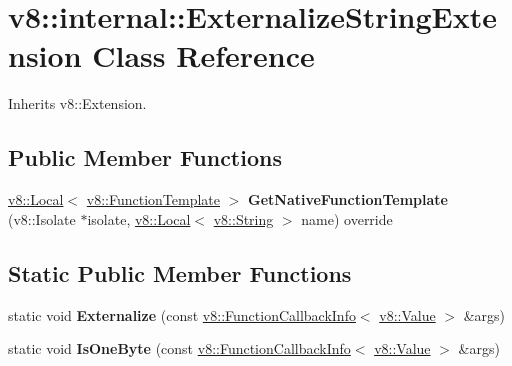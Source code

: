 \hypertarget{classv8_1_1internal_1_1ExternalizeStringExtension}{}\section{v8\+:\+:internal\+:\+:Externalize\+String\+Extension Class Reference}
\label{classv8_1_1internal_1_1ExternalizeStringExtension}


Inherits v8\+::\+Extension.

\subsection*{Public Member Functions}
\begin{DoxyCompactItemize}
\item 
\mbox{\label{classv8_1_1internal_1_1ExternalizeStringExtension_a04e0ada6e17a1889a5d71c052f2f6aa7}} 
\mbox{\hyperlink{classv8_1_1Local}{v8\+::\+Local}}$<$ \mbox{\hyperlink{classv8_1_1FunctionTemplate}{v8\+::\+Function\+Template}} $>$ {\bfseries Get\+Native\+Function\+Template} (v8\+::\+Isolate $\ast$isolate, \mbox{\hyperlink{classv8_1_1Local}{v8\+::\+Local}}$<$ \mbox{\hyperlink{classv8_1_1String}{v8\+::\+String}} $>$ name) override
\end{DoxyCompactItemize}
\subsection*{Static Public Member Functions}
\begin{DoxyCompactItemize}
\item 
\mbox{\label{classv8_1_1internal_1_1ExternalizeStringExtension_ab6860f3c06f65fc49de65ef44a0006e0}} 
static void {\bfseries Externalize} (const \mbox{\hyperlink{classv8_1_1FunctionCallbackInfo}{v8\+::\+Function\+Callback\+Info}}$<$ \mbox{\hyperlink{classv8_1_1Value}{v8\+::\+Value}} $>$ \&args)
\item 
\mbox{\label{classv8_1_1internal_1_1ExternalizeStringExtension_a379a483fb71100d7ce95094e25427076}} 
static void {\bfseries Is\+One\+Byte} (const \mbox{\hyperlink{classv8_1_1FunctionCallbackInfo}{v8\+::\+Function\+Callback\+Info}}$<$ \mbox{\hyperlink{classv8_1_1Value}{v8\+::\+Value}} $>$ \&args)
\end{DoxyCompactItemize}



